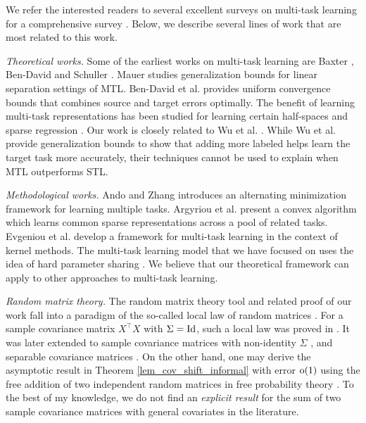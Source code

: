 We refer the interested readers to several excellent surveys on multi-task  learning for a comprehensive survey \cite{PY09,R17,ZY17,V20}.
Below, we describe several lines of work that are most related to this work.

\textit{Theoretical works.}
Some of the earliest works on multi-task learning are Baxter \cite{B00}, Ben-David and Schuller \cite{BS03}.
Mauer \cite{M06} studies generalization bounds for linear separation settings of MTL.
Ben-David et al. \cite{BBCK10} provides uniform convergence bounds that combines source and target errors optimally.
The benefit of learning multi-task representations has been studied for learning certain half-spaces \cite{MPR16} and sparse regression \cite{LPTV09,LPVT11}.
Our work is closely related to Wu et al. \cite{WZR20}.
While Wu et al. provide generalization bounds to show that adding more labeled helps learn the target task more accurately, their techniques cannot be used to explain when MTL outperforms STL.

\textit{Methodological works.}
Ando and Zhang \cite{AZ05} introduces an alternating minimization framework for learning multiple tasks.
Argyriou et al. \cite{AEP08} present a convex algorithm which learns common sparse representations across a pool of related tasks.
Evgeniou et al. \cite{EMP05} develop a framework for multi-task learning in the context of kernel methods.
The multi-task learning model that we have focused on uses the idea of hard parameter sharing \cite{C93,KD12,R17}.
We believe that our theoretical framework can apply to other approaches to multi-task learning.

\textit{Random matrix theory.}
The random matrix theory tool and related proof of our work fall into a paradigm of the so-called local law of random matrices \cite{erdos2017dynamical}.
For a sample covariance matrix $X^\top X$ with $\Sigma=\operatorname{Id}$, such a local law was proved in \cite{isotropic}.
It was later extended to sample covariance matrices with non-identity $\Sigma$ \cite{Anisotropic}, and separable covariance matrices \cite{yang2019spiked}. On the other hand, one may derive the asymptotic result in Theorem \ref{lem_cov_shift_informal} with error $\operatorname{o}(1)$ using the free addition of two independent random matrices in free probability theory \cite{nica2006lectures}. To the best of my knowledge, we do not find an {\it explicit result} for the sum of two sample covariance matrices with general covariates in the literature.

